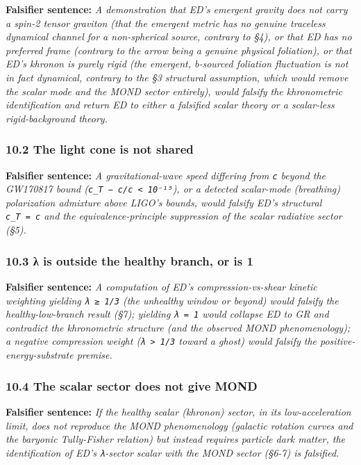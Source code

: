 \documentclass[
]{article}
\begin{document}
\textbf{Falsifier sentence:} \emph{A demonstration that ED's emergent
gravity does not carry a spin-2 tensor graviton (that the emergent
metric has no genuine traceless dynamical channel for a non-spherical
source, contrary to §4), or that ED has no preferred frame (contrary to
the arrow being a genuine physical foliation), or that ED's khronon is
purely rigid (the emergent, b-sourced foliation fluctuation is not in
fact dynamical, contrary to the §3 structural assumption, which would
remove the scalar mode and the MOND sector entirely), would falsify the
khronometric identification and return ED to either a falsified scalar
theory or a scalar-less rigid-background theory.}

\subsubsection{10.2 The light cone is not
shared}\label{the-light-cone-is-not-shared}

\textbf{Falsifier sentence:} \emph{A gravitational-wave speed differing
from \texttt{c} beyond the GW170817 bound
(\texttt{\textbar{}c\_T\ −\ c\textbar{}/c\ \textless{}\ 10⁻¹⁵}), or a
detected scalar-mode (breathing) polarization admixture above LIGO's
bounds, would falsify ED's structural \texttt{c\_T\ =\ c} and the
equivalence-principle suppression of the scalar radiative sector (§5).}

\subsubsection{10.3 λ is outside the healthy branch, or is
1}\label{ux3bb-is-outside-the-healthy-branch-or-is-1}

\textbf{Falsifier sentence:} \emph{A computation of ED's
compression-vs-shear kinetic weighting yielding \texttt{λ\ ≥\ 1/3} (the
unhealthy window or beyond) would falsify the healthy-low-branch result
(§7); yielding \texttt{λ\ =\ 1} would collapse ED to GR and contradict
the khronometric structure (and the observed MOND phenomenology); a
negative compression weight (\texttt{λ\ \textgreater{}\ 1/3} toward a
ghost) would falsify the positive-energy-substrate premise.}

\subsubsection{10.4 The scalar sector does not give
MOND}\label{the-scalar-sector-does-not-give-mond}

\textbf{Falsifier sentence:} \emph{If the healthy scalar (khronon)
sector, in its low-acceleration limit, does not reproduce the MOND
phenomenology (galactic rotation curves and the baryonic Tully-Fisher
relation) but instead requires particle dark matter, the identification
of ED's \texttt{λ}-sector scalar with the MOND sector (§6-7) is
falsified.}
\end{document}
